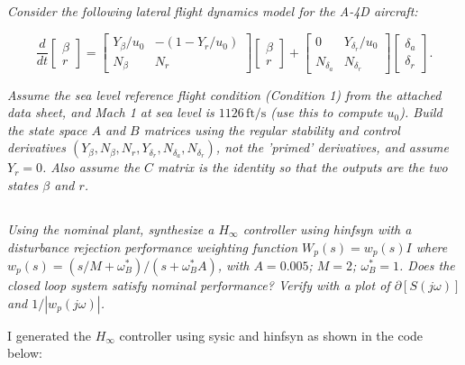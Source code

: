 \documentclass{article}
\begin{document}
\section{}

\textit{Consider the following lateral flight dynamics model for the A-4D aircraft:}

\[
\frac{d}{d t}
\begin{bmatrix}
\beta \\
r
\end{bmatrix}
=
\begin{bmatrix}
Y_\beta / u_0 & -\left(1 - Y_r / u_0\right) \\
N_\beta & N_r
\end{bmatrix}
\begin{bmatrix}
\beta \\
r
\end{bmatrix}
+
\begin{bmatrix}
0 & Y_{\delta_r} / u_0 \\
N_{\delta_a} & N_{\delta_r}
\end{bmatrix}
\begin{bmatrix}
\delta_a \\
\delta_r
\end{bmatrix}.
\]

\textit{Assume the sea level reference flight condition (Condition 1) from the attached data sheet, and Mach 1 at sea level is $1126 \, \text{ft/s}$ (use this to compute $u_0$). Build the state space $A$ and $B$ matrices using the regular stability and control derivatives $\left(Y_\beta, N_\beta, N_r, Y_{\delta_r}, N_{\delta_a}, N_{\delta_r}\right)$, not the 'primed' derivatives, and assume $Y_r = 0$. Also assume the $C$ matrix is the identity so that the outputs are the two states $\beta$ and $r$.}

\subsection{}

\textit{Using the nominal plant, synthesize a $H_{\infty}$ controller using hinfsyn with a disturbance rejection performance weighting function $W_p(s) = w_p(s) I$ where $w_p(s) = \left(s / M + \omega_B^*\right) / \left(s + \omega_B^* A\right)$, with $A = 0.005$; $M = 2$; $\omega_B^* = 1$. Does the closed loop system satisfy nominal performance? Verify with a plot of $\partial[S(j \omega)]$ and $1 / \left| w_p(j \omega) \right|$.}

I generated the $H_\infty$ controller using sysic and hinfsyn as shown in the code below:
\end{document}
